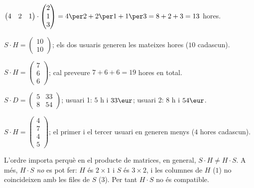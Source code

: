 \begin{solucions}
\begin{sollist}
  \item $\begin{pmatrix} 4 & 2 & 1 \end{pmatrix}\cdot\begin{pmatrix} 2 \\ 1 \\ 3 \end{pmatrix}
        =4\per 2+2\per 1+1\per 3=8+2+3=13$ hores.
  \item $S\cdot H=\begin{pmatrix} 10 \\ 10 \end{pmatrix}$;
        \;els dos usuaris generen les mateixes hores ($10$ cadascun).
  \item $S\cdot H=\begin{pmatrix} 7 \\ 6 \\ 6 \end{pmatrix}$;
        \;cal preveure $7+6+6=19$ hores en total.
  \item $S\cdot D=\begin{pmatrix} 5 & 33 \\ 8 & 54 \end{pmatrix}$;
        \;usuari 1: $5$ h i $33\eur$; usuari 2: $8$ h i $54\eur$.
  \item $S\cdot H=\begin{pmatrix} 4 \\ 7 \\ 4 \\ 5 \end{pmatrix}$;
        \;el primer i el tercer usuari en generen menys ($4$ hores cadascun).
  \item L'ordre importa perquè en el producte de matrices, en general,
        $S\cdot H\neq H\cdot S$. A més, $H\cdot S$ \emph{no} es pot fer: $H$ és
        $2\times 1$ i $S$ és $3\times 2$, i les columnes de $H$ ($1$) no coincideixen
        amb les files de $S$ ($3$). Per tant $H\cdot S$ no és compatible.
\end{sollist}
\end{solucions}
